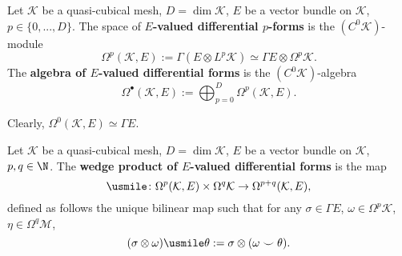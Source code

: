 \begin{definition}
  Let
    $\mathcal{K}$ be a quasi-cubical mesh,
    $D = \dim \mathcal{K}$,
    $E$ be a vector bundle on $\mathcal{K}$,
    $p \in \{0, ..., D\}$.
  The space of \textbf{$E$-valued differential $p$-forms} is the
  $(C^0 \mathcal{K})$-module
  \begin{equation}
    \Omega^{p}(\mathcal{K}, E)
    := \Gamma(E \otimes L^p \mathcal{K})
    \simeq \Gamma E \otimes \Omega^p \mathcal{K}.
  \end{equation}
  The \textbf{algebra of $E$-valued differential forms} is the
  $(C^0 \mathcal{K})$-algebra
  \begin{equation}
    \Omega^\bullet(\mathcal{K}, E)
    := \bigoplus_{p = 0}^D \Omega^p(\mathcal{K}, E).
  \end{equation}
\end{definition}
\begin{remark}
  Clearly, $\Omega^{0}(\mathcal{K}, E) \simeq \Gamma E$.
\end{remark}
\begin{definition}
  Let
    $\mathcal{K}$ be a quasi-cubical mesh,
    $D = \dim \mathcal{K}$,
    $E$ be a vector bundle on $\mathcal{K}$,
    $p, q \in \N$.
  The \textbf{wedge product of $E$-valued differential forms} is the map
  \begin{equation}
    \usmile
    \colon \Omega^p(\mathcal{K}, E) \times \Omega^q \mathcal{K}
    \to \Omega^{p + q}(\mathcal{K}, E),
  \end{equation}
  defined as follows the unique bilinear map such that for any
  $\sigma \in \Gamma E$,
  $\omega \in \Omega^p \mathcal{K}$,
  $\eta \in \Omega^q \mathcal{M}$,
  \begin{equation}
    (\sigma \otimes \omega) \usmile \theta :=
    \sigma \otimes (\omega \smile \theta).
  \end{equation}
\end{definition}
